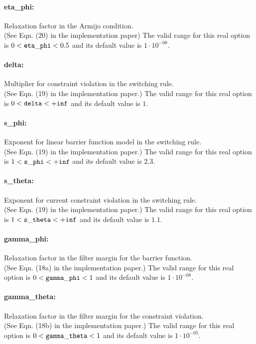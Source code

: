 \paragraph{eta\_phi:} Relaxation factor in the Armijo condition. $\;$ \\
 (See Eqn. (20) in the implementation paper) The valid range for this real option is 
$0 <  {\tt eta\_phi } <  0.5$
and its default value is $1 \cdot 10^{-08}$.


\paragraph{delta:} Multiplier for constraint violation in the switching rule. $\;$ \\
 (See Eqn. (19) in the implementation paper.) The valid range for this real option is 
$0 <  {\tt delta } <  {\tt +inf}$
and its default value is $1$.


\paragraph{s\_phi:} Exponent for linear barrier function model in the switching rule. $\;$ \\
 (See Eqn. (19) in the implementation paper.) The valid range for this real option is 
$1 <  {\tt s\_phi } <  {\tt +inf}$
and its default value is $2.3$.


\paragraph{s\_theta:} Exponent for current constraint violation in the switching rule. $\;$ \\
 (See Eqn. (19) in the implementation paper.) The valid range for this real option is 
$1 <  {\tt s\_theta } <  {\tt +inf}$
and its default value is $1.1$.


\paragraph{gamma\_phi:} Relaxation factor in the filter margin for the barrier function. $\;$ \\
 (See Eqn. (18a) in the implementation paper.) The valid range for this real option is 
$0 <  {\tt gamma\_phi } <  1$
and its default value is $1 \cdot 10^{-08}$.


\paragraph{gamma\_theta:} Relaxation factor in the filter margin for the constraint violation. $\;$ \\
 (See Eqn. (18b) in the implementation paper.) The valid range for this real option is 
$0 <  {\tt gamma\_theta } <  1$
and its default value is $1 \cdot 10^{-05}$.


